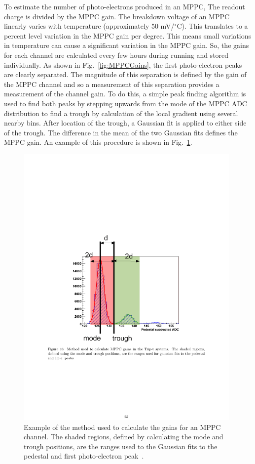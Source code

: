{To estimate the number of photo-electrons produced in an MPPC, The readout charge is divided by the MPPC gain.  The breakdown voltage of an MPPC linearly varies with temperature (approximately 50 mV/$^\circ$C).  This translates to a percent level variation in the MPPC gain per degree.  This means small variations in temperature can cause a significant variation in the MPPC gain.  So, the gains for each channel are calculated every few hours during running and stored individually.  As shown in Fig.~\ref{fig:MPPCGains}, the first photo-electron peaks are clearly separated.  The magnitude of this separation is defined by the gain of the MPPC channel and so a measurement of this separation provides a measurement of the channel gain.  To do this, a simple peak finding algorithm is used to find both peaks by stepping upwards from the mode of the MPPC ADC distribution to find a trough by calculation of the local gradient using several nearby bins.  After location of the trough, a Gaussian fit is applied to either side of the trough.  The difference in the mean of the two Gaussian fits defines the MPPC gain.  An example of this procedure is shown in Fig.~\ref{fig:MPPCGainCalculation}}.
\begin{figure}[t!]
  \centering
  \includegraphics[width=11cm]{images/software/MPPC_Gain_Calculation.pdf}
  \caption{Example of the method used to calculate the gains for an MPPC channel.  The shaded regions, defined by calculating the mode and trough positions, are the ranges used to the Gaussian fits to the pedestal and first photo-electron peak~\cite{ND280CalibTN}.}
  \label{fig:MPPCGainCalculation}
\end{figure}
